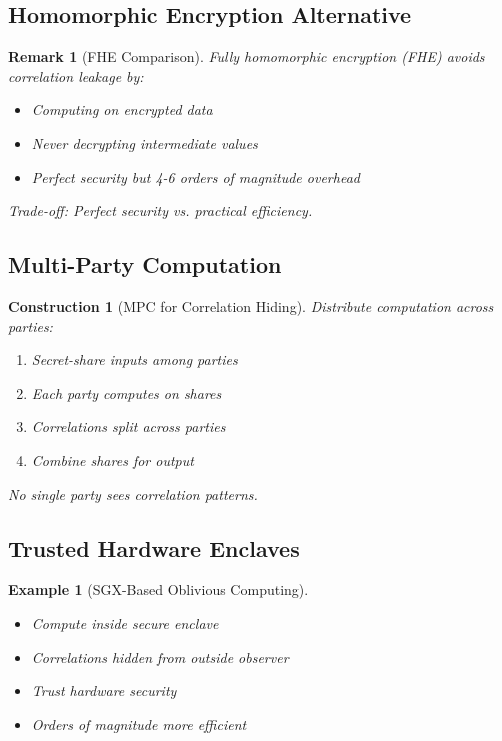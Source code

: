 \documentclass[11pt,final]{article}
\newtheorem{example}[theorem]{Example}
\newtheorem{remark}[theorem]{Remark}
\newtheorem{construction}[theorem]{Construction}
\begin{document}
\subsection{Homomorphic Encryption Alternative}

\begin{remark}[FHE Comparison]
Fully homomorphic encryption (FHE) avoids correlation leakage by:
\begin{itemize}
    \item Computing on encrypted data
    \item Never decrypting intermediate values
    \item Perfect security but 4-6 orders of magnitude overhead
\end{itemize}
Trade-off: Perfect security vs. practical efficiency.
\end{remark}

\subsection{Multi-Party Computation}

\begin{construction}[MPC for Correlation Hiding]
Distribute computation across parties:
\begin{enumerate}
    \item Secret-share inputs among parties
    \item Each party computes on shares
    \item Correlations split across parties
    \item Combine shares for output
\end{enumerate}
No single party sees correlation patterns.
\end{construction}

\subsection{Trusted Hardware Enclaves}

\begin{example}[SGX-Based Oblivious Computing]
\begin{itemize}
    \item Compute inside secure enclave
    \item Correlations hidden from outside observer
    \item Trust hardware security
    \item Orders of magnitude more efficient
\end{itemize}
\end{example}
\end{document}
